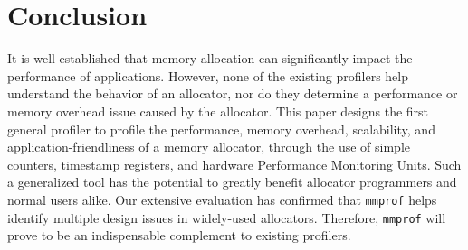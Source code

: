 \section{Conclusion}
\label{sec:conclusion}

It is well established that memory allocation can significantly impact the performance of applications. However, none of the existing profilers help understand the behavior of an allocator, nor do they determine a performance or memory overhead issue caused by the allocator. This paper designs the first general profiler to profile the performance, memory overhead, scalability, and application-friendliness of a memory allocator, through the use of simple counters, timestamp registers, and hardware Performance Monitoring Units. Such a generalized tool has the potential to greatly benefit allocator programmers and normal users alike. Our extensive evaluation has confirmed that \texttt{mmprof} helps identify multiple design issues in widely-used allocators. Therefore, \texttt{mmprof} will prove to be an indispensable complement to existing profilers. 